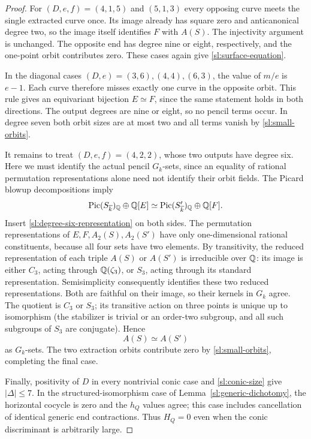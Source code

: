 \begin{proof}
For $(D,e,f)=(4,1,5)$ and $(5,1,3)$ every opposing curve meets the
single extracted curve once.  Its image already has square zero and
anticanonical degree two, so the image itself identifies $F$ with
$A(S)$.  The injectivity argument is unchanged.  The opposite end has
degree nine or eight, respectively, and the one-point orbit contributes
zero.  These cases again give \eqref{sl:surface-equation}.

In the diagonal cases $(D,e)=(3,6),(4,4),(6,3)$, the value of $m/e$
is $e-1$.  Each curve therefore misses exactly one curve in the opposite
orbit.  This rule gives an equivariant bijection $E\simeq F$, since
the same statement holds in both directions.  The output degrees are
nine or eight, so no pencil terms occur.  In degree seven both orbit
sizes are at most two and all terms vanish by \eqref{sl:small-orbits}.

It remains to treat $(D,e,f)=(4,2,2)$, whose two outputs have degree
six.  Here we must identify the actual pencil $G_k$-sets, since an
equality of rational permutation representations alone need not
identify their orbit fields.  The Picard blowup decompositions imply
\[
 \operatorname{Pic}(S_{\overline k})_\mathbb Q\oplus\mathbb Q[E]
 \simeq
 \operatorname{Pic}(S'_{\overline k})_\mathbb Q\oplus\mathbb Q[F].
\]
Insert \eqref{sl:degree-six-representation} on both sides.  The
permutation representations of $E,F,A_2(S),A_2(S')$ have only
one-dimensional rational constituents, because all four sets have
two elements.  By transitivity, the reduced representation of each
triple $A(S)$ or $A(S')$ is irreducible over $\mathbb Q$: its image is either
$C_3$, acting through $\mathbb Q(\zeta_3)$, or $S_3$, acting through its
standard representation.  Semisimplicity consequently identifies
these two reduced representations.  Both are faithful on their
image, so their kernels in $G_k$ agree.  The quotient is $C_3$ or
$S_3$; its transitive action on three points is unique up to
isomorphism (the stabilizer is trivial or an order-two subgroup,
and all such subgroups of $S_3$ are conjugate).  Hence
\[
 A(S)\simeq A(S')
\]
as $G_k$-sets.  The two extraction orbits contribute zero by
\eqref{sl:small-orbits}, completing the final case.

Finally, positivity of $D$ in every nontrivial conic case and
\eqref{sl:conic-size} give $|\Delta|\leq7$.  In the structured-isomorphism
case of Lemma~\ref{sl:generic-dichotomy}, the horizontal cocycle is
zero and the $h_Q$ values agree; this case includes cancellation of
identical generic end contractions.  Thus $H_Q=0$ even when the conic
discriminant is arbitrarily large.
\end{proof}

